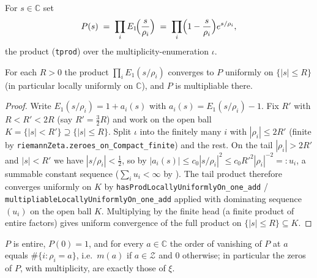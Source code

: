 \begin{definition}
\label{def:hf_prod}
\leanok
{}
For $s\in\mathbb C$ set
\[
  P(s)\;=\;\prod_i E_1\!\Bigl(\frac s{\rho_i}\Bigr)
        \;=\;\prod_i\Bigl(1-\frac s{\rho_i}\Bigr)e^{s/\rho_i},
\]
the product (\texttt{tprod}) over the multiplicity-enumeration $\iota$.
\end{definition}

\begin{lemma}
\label{lem:hf_prod_summable}
\leanok
{}
For each $R>0$ the product $\prod_i E_1(s/\rho_i)$ converges to $P$ uniformly on
$\{|s|\le R\}$ (in particular locally uniformly on $\mathbb C$), and $P$ is
multipliable there.
\end{lemma}

\begin{proof}
\leanok
{}
Write $E_1(s/\rho_i)=1+a_i(s)$ with $a_i(s)=E_1(s/\rho_i)-1$. Fix $R'$ with
$R<R'<2R$ (say $R'=\tfrac32R$) and work on the open ball $K=\{|s|<R'\}\supseteq
\{|s|\le R\}$. Split $\iota$ into the finitely many $i$ with $|\rho_i|\le2R'$
(finite by \texttt{riemannZeta.zeroes\_on\_Compact\_finite}) and the rest. On the
tail $|\rho_i|>2R'$ and $|s|<R'$ we have $|s/\rho_i|<\tfrac12$, so by
 $|a_i(s)|\le c_0|s/\rho_i|^{2}\le c_0R'^{2}|\rho_i|^{-2}=:u_i$,
a summable constant sequence ($\sum_i u_i<\infty$ by ). The
tail product therefore converges uniformly on $K$ by
\texttt{hasProdLocallyUniformlyOn\_one\_add} / \texttt{multipliableLocallyUniformlyOn\_one\_add}
applied with dominating sequence $(u_i)$ on the open ball $K$. Multiplying by
the finite head (a finite product of entire factors) gives uniform convergence of
the full product on $\{|s|\le R\}\subseteq K$.
\end{proof}

\begin{lemma}
\label{lem:hf_prod_entire}
\leanok
{}
$P$ is entire, $P(0)=1$, and for every $a\in\mathbb C$ the order of vanishing of
$P$ at $a$ equals $\#\{i:\rho_i=a\}$, i.e.\ $m(a)$ if $a\in\mathcal Z$ and $0$
otherwise; in particular the zeros of $P$, with multiplicity, are exactly those of
$\xi$.
\end{lemma}

